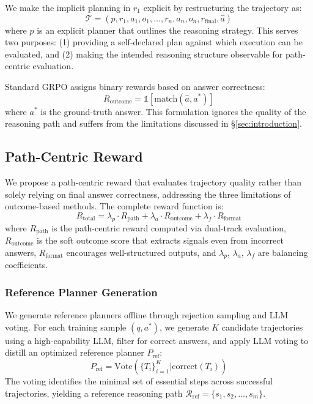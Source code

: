 \documentclass[11pt]{article}
\begin{document}
We make the implicit planning in $r_1$ explicit by restructuring the trajectory as:
\begin{equation}
\mathcal{T} = (p, r_1, a_1, o_1, \ldots, r_n, a_n, o_n, r_{\text{final}}, \hat{a})
\end{equation}
where $p$ is an explicit planner that outlines the reasoning strategy. This serves two purposes: (1) providing a self-declared plan against which execution can be evaluated, and (2) making the intended reasoning structure observable for path-centric evaluation.

Standard GRPO assigns binary rewards based on answer correctness:
\begin{equation}
R_{\text{outcome}} = \mathbb{1}[\text{match}(\hat{a}, a^*)]
\end{equation}
where $a^*$ is the ground-truth answer.
This formulation ignores the quality of the reasoning path and suffers from the limitations discussed in \S\ref{sec:introduction}.

\subsection{Path-Centric Reward}
\label{ssec:path_reward}

We propose a path-centric reward that evaluates trajectory quality rather than solely relying on final answer correctness, addressing the three limitations of outcome-based methods. The complete reward function is:
\begin{equation}
R_{\text{total}} = \lambda_p \cdot R_{\text{path}} + \lambda_a \cdot R_{\text{outcome}} + \lambda_f \cdot R_{\text{format}}
\end{equation}
where $R_{\text{path}}$ is the path-centric reward computed via dual-track evaluation, $R_{\text{outcome}}$ is the soft outcome score that extracts signals even from incorrect answers, $R_{\text{format}}$ encourages well-structured outputs, and $\lambda_p$, $\lambda_a$, $\lambda_f$ are balancing coefficients.

\subsubsection{Reference Planner Generation}
\label{sssec:reference}

We generate reference planners offline through rejection sampling and LLM voting.
For each training sample $(q, a^*)$, we generate $K$ candidate trajectories using a high-capability LLM, filter for correct answers, and apply LLM voting to distill an optimized reference planner $P_{\text{ref}}$:
\begin{equation}
P_{\text{ref}} = \text{Vote}(\{T_i\}_{i=1}^{K} | \text{correct}(T_i))
\end{equation}
The voting identifies the minimal set of essential steps across successful trajectories, yielding a reference reasoning path $\mathcal{R}_{\text{ref}} = \{s_1, s_2, \ldots, s_m\}$.
\end{document}
